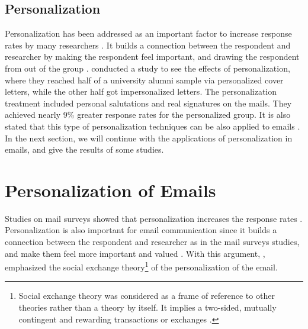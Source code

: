 \subsection{Personalization}
\label{sec:2.2.3:Pers}
Personalization has been addressed as an important factor to increase response rates by many researchers \citep{Dillman1991,Schaefer1998}. It builds a connection between the respondent and researcher by making the respondent feel important, and drawing the respondent from out of the group \citep[page 272]{DillmanDonA.SmythJoleneD.Christian2009}. \cite{Dillman1974a} conducted a study to see the effects of personalization, where they reached half of a university alumni sample via personalized cover letters, while the other half got impersonalized letters. The personalization treatment included personal salutations and real signatures on the mails. They achieved nearly 9\% greater response rates for the personalized group. It is also stated that this type of personalization techniques can be also applied to emails \citep{Schaefer1998}. In the next section, we will continue with the applications of personalization in emails, and give the results of some studies.

\section{Personalization of Emails}
\label{sec:2.3:PersEmai}
Studies on mail surveys showed that personalization increases the response rates \citep{Dillman1991,Schaefer1998}. Personalization is also important for email communication since it builds a connection between the respondent and researcher as in the mail surveys studies, and make them feel more important and valued \citep[page 272]{DillmanDonA.SmythJoleneD.Christian2009}. With this argument, \cite{DillmanDonA.SmythJoleneD.Christian2009}, emphasized the social exchange theory\footnote{Social exchange theory was considered as a frame of reference to other theories rather than a theory by itself. It implies a two-sided, mutually contingent and rewarding transactions or exchanges \citep{Emerson1976}.} of the personalization of the email.
\vspace{1cm}


